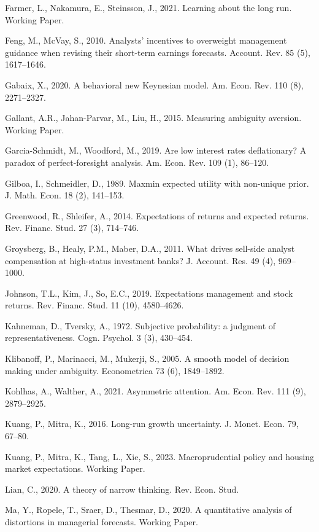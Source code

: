 \documentclass[12pt,a4paper]{article}
\newenvironment{original}
  {\par\medskip\noindent\ignorespaces}
  {\par\medskip}
\begin{document}
\begin{original}
\noindent Farmer, L., Nakamura, E., Steinsson, J., 2021. Learning about the long run. Working Paper.

\noindent Feng, M., McVay, S., 2010. Analysts' incentives to overweight management guidance when revising their short-term earnings forecasts. Account. Rev. 85 (5), 1617--1646.

\noindent Gabaix, X., 2020. A behavioral new Keynesian model. Am. Econ. Rev. 110 (8), 2271--2327.

\noindent Gallant, A.R., Jahan-Parvar, M., Liu, H., 2015. Measuring ambiguity aversion. Working Paper.

\noindent Garcia-Schmidt, M., Woodford, M., 2019. Are low interest rates deflationary? A paradox of perfect-foresight analysis. Am. Econ. Rev. 109 (1), 86--120.

\noindent Gilboa, I., Schmeidler, D., 1989. Maxmin expected utility with non-unique prior. J. Math. Econ. 18 (2), 141--153.

\noindent Greenwood, R., Shleifer, A., 2014. Expectations of returns and expected returns. Rev. Financ. Stud. 27 (3), 714--746.

\noindent Groysberg, B., Healy, P.M., Maber, D.A., 2011. What drives sell-side analyst compensation at high-status investment banks? J. Account. Res. 49 (4), 969--1000.

\noindent Johnson, T.L., Kim, J., So, E.C., 2019. Expectations management and stock returns. Rev. Financ. Stud. 11 (10), 4580--4626.

\noindent Kahneman, D., Tversky, A., 1972. Subjective probability: a judgment of representativeness. Cogn. Psychol. 3 (3), 430--454.

\noindent Klibanoff, P., Marinacci, M., Mukerji, S., 2005. A smooth model of decision making under ambiguity. Econometrica 73 (6), 1849--1892.

\noindent Kohlhas, A., Walther, A., 2021. Asymmetric attention. Am. Econ. Rev. 111 (9), 2879--2925.

\noindent Kuang, P., Mitra, K., 2016. Long-run growth uncertainty. J. Monet. Econ. 79, 67--80.

\noindent Kuang, P., Mitra, K., Tang, L., Xie, S., 2023. Macroprudential policy and housing market expectations. Working Paper.

\noindent Lian, C., 2020. A theory of narrow thinking. Rev. Econ. Stud.

\noindent Ma, Y., Ropele, T., Sraer, D., Thesmar, D., 2020. A quantitative analysis of distortions in managerial forecasts. Working Paper.


\end{original}
\end{document}
